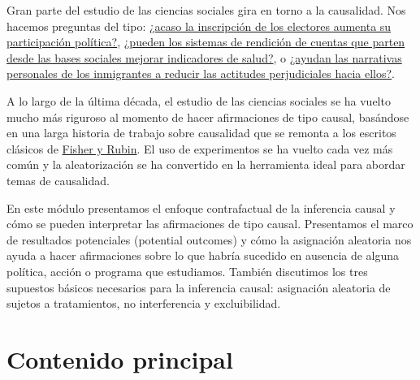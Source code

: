 \documentclass[12pt,spanish,]{book}
\begin{document}
Gran parte del estudio de las ciencias sociales gira en torno a la causalidad. Nos hacemos preguntas del tipo: \href{https://egap.org/resource/electoral-administration-in-kenya/}{¿acaso la inscripción de los electores aumenta su participación política?}, \href{https:\%20//\%20egap.org/resource/does-bottom-up-accountability-work-evidence-from-uganda/}{¿pueden los sistemas de rendición de cuentas que parten desde las bases sociales mejorar indicadores de salud?}, o \href{https://egap.org/resource/brief\%20-70-cómo-las-narrativas-personales-reducen-las-actitudes-negativas-hacia-los-inmigrantes-en-Kenia\%20/}{¿ayudan las narrativas personales de los inmigrantes a reducir las actitudes perjudiciales hacia ellos?}.

A lo largo de la última década, el estudio de las ciencias sociales se ha vuelto mucho más riguroso al momento de hacer afirmaciones de tipo causal, basándose en una larga historia de trabajo sobre causalidad que se remonta a los escritos clásicos de \protect\hyperlink{ux5cux2520causalinference-classics}{Fisher y Rubin}. El uso de experimentos se ha vuelto cada vez más común y la aleatorización se ha convertido en la herramienta ideal para abordar temas de causalidad.

En este módulo presentamos el enfoque contrafactual de la inferencia causal y cómo se pueden interpretar las afirmaciones de tipo causal. Presentamos el marco de resultados potenciales (potential outcomes) y cómo la asignación aleatoria nos ayuda a hacer afirmaciones sobre lo que habría sucedido en ausencia de alguna política, acción o programa que estudiamos. También discutimos los tres supuestos básicos necesarios para la inferencia causal: asignación aleatoria de sujetos a tratamientos, no interferencia y excluibilidad.

\hypertarget{contenido-principal-1}{%
\section{Contenido principal}\label{contenido-principal-1}}
\end{document}
